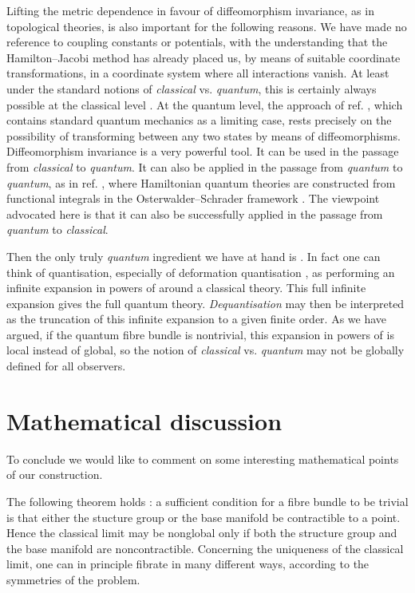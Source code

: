 \documentclass[a4paper,a4paper]{article}
\begin{document}
Lifting the metric dependence in favour of diffeomorphism invariance,
as in topological theories, is also important for the following reasons.
We have made no reference to coupling constants or potentials, with the understanding 
that the Hamilton--Jacobi method has already placed us, by means of suitable coordinate 
transformations, in a coordinate system where all interactions vanish. At least under 
the standard notions \cite{GALINDO} of {\it classical} vs. {\it quantum}, 
this is certainly always possible at the classical level \cite{DR}. At the quantum level, 
the approach of ref. \cite{MATONE}, which contains standard quantum mechanics 
as a limiting case, rests precisely on the possibility of transforming between 
any two states by means of diffeomorphisms. Diffeomorphism invariance is  
a very powerful tool. It can be used \cite{MATONE} in the passage from {\it classical} 
to {\it quantum}. It can also be applied in the passage 
from {\it quantum} to {\it quantum}, as in ref. \cite{MOURAO}, where Hamiltonian quantum 
theories are constructed from functional integrals in the Osterwalder--Schrader framework
\cite{OS, GJ}. The viewpoint advocated here is that it can also 
be successfully applied in the passage from {\it quantum} to {\it classical}.
 
Then the only truly {\it quantum} ingredient we have at hand is \myHighlight{$\hbar$}\coordHE{}. In fact
one can think of quantisation, especially of deformation quantisation 
\cite{STERNHEIMER, ZACHOS}, as 
performing an infinite expansion in powers of \myHighlight{$\hbar$}\coordHE{} around a classical theory. 
This full infinite expansion gives the full quantum theory. {\it Dequantisation} may then be 
interpreted as the truncation of this infinite expansion to a given finite order.
As we have argued, if the quantum fibre bundle \coordHE{} is nontrivial, 
this expansion in powers of \myHighlight{$\hbar$}\coordHE{} is local instead of global, so the 
notion of {\it classical} vs. {\it quantum} may not be globally defined for 
all observers.

\section{Mathematical discussion}\label{mathtech}

To conclude we would like to comment on some interesting mathematical 
points of our construction.

The following theorem holds \cite{STEENROD}: a sufficient condition for a fibre bundle 
to be trivial is that either the stucture group or the base manifold be contractible 
to a point. Hence the classical limit may be nonglobal only if both the structure group 
and the base manifold are noncontractible. Concerning the uniqueness of the classical limit, 
one can in principle fibrate \coordHE{} in many different ways, according to the symmetries 
of the problem. 
\end{document}
